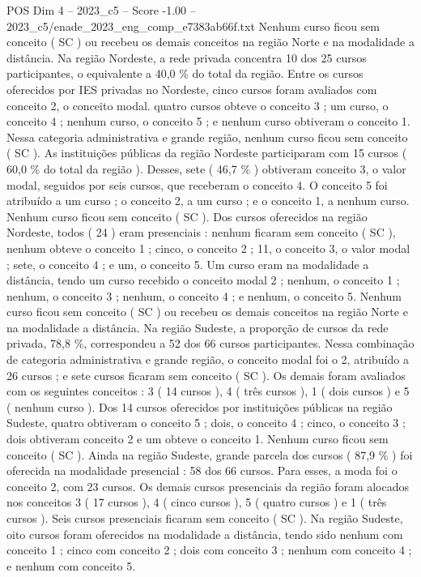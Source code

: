 \begin{textsample}{POS Dim 4 – 2023\_c5 – Score -1.00 – 2023\_c5/enade\_2023\_eng\_comp\_e7383ab66f.txt}
Nenhum curso ficou sem conceito ( SC ) ou recebeu os demais conceitos na região Norte e na modalidade a distância.
Na região Nordeste, a rede privada concentra 10 dos 25 cursos participantes, o equivalente a 40,0 \% do total da região.
Entre os cursos oferecidos por IES privadas no Nordeste, cinco cursos foram avaliados com conceito 2, o conceito modal. quatro cursos obteve o conceito 3 ; um curso, o conceito 4 ; nenhum curso, o conceito 5 ; e nenhum curso obtiveram o conceito 1.
Nessa categoria administrativa e grande região, nenhum curso ficou sem conceito ( SC ).
As instituições públicas da região Nordeste participaram com 15 cursos ( 60,0 \% do total da região ).
Desses, sete ( 46,7 \% ) obtiveram conceito 3, o valor modal, seguidos por seis cursos, que receberam o conceito 4.
O conceito 5 foi atribuído a um curso ; o conceito 2, a um curso ; e o conceito 1, a nenhum curso.
Nenhum curso ficou sem conceito ( SC ).
Dos cursos oferecidos na região Nordeste, todos ( 24 ) eram presenciais : nenhum ficaram sem conceito ( SC ), nenhum obteve o conceito 1 ; cinco, o conceito 2 ; 11, o conceito 3, o valor modal ; sete, o conceito 4 ; e um, o conceito 5.
Um curso eram na modalidade a distância, tendo um curso recebido o conceito modal 2 ; nenhum, o conceito 1 ; nenhum, o conceito 3 ; nenhum, o conceito 4 ; e nenhum, o conceito 5.
Nenhum curso ficou sem conceito ( SC ) ou recebeu os demais conceitos na região Norte e na modalidade a distância.
Na região Sudeste, a proporção de cursos da rede privada, 78,8 \%, correspondeu a 52 dos 66 cursos participantes.
Nessa combinação de categoria administrativa e grande região, o conceito modal foi o 2, atribuído a 26 cursos ; e sete cursos ficaram sem conceito ( SC ).
Os demais foram avaliados com os seguintes conceitos : 3 ( 14 cursos ), 4 ( três cursos ), 1 ( dois cursos ) e 5 ( nenhum curso ).
Dos 14 cursos oferecidos por instituições públicas na região Sudeste, quatro obtiveram o conceito 5 ; dois, o conceito 4 ; cinco, o conceito 3 ; dois obtiveram conceito 2 e um obteve o conceito 1.
Nenhum curso ficou sem conceito ( SC ).
Ainda na região Sudeste, grande parcela dos cursos ( 87,9 \% ) foi oferecida na modalidade presencial : 58 dos 66 cursos.
Para esses, a moda foi o conceito 2, com 23 cursos.
Os demais cursos presenciais da região foram alocados nos conceitos 3 ( 17 cursos ), 4 ( cinco cursos ), 5 ( quatro cursos ) e 1 ( três cursos ).
Seis cursos presenciais ficaram sem conceito ( SC ).
Na região Sudeste, oito cursos foram oferecidos na modalidade a distância, tendo sido nenhum com conceito 1 ; cinco com conceito 2 ; dois com conceito 3 ; nenhum com conceito 4 ; e nenhum com conceito 5.

\end{textsample}
